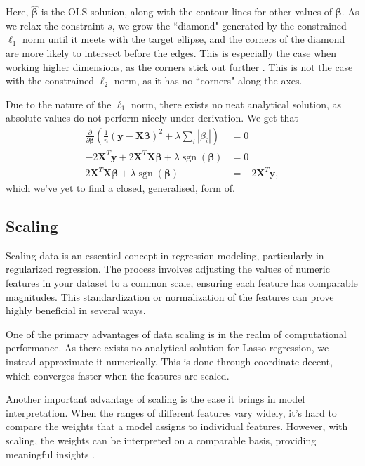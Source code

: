 \documentclass{article}
\DeclareMathOperator*{\sgn}{sgn}
\begin{document}
Here, $\boldsymbol{\hat{\beta}}$ is the OLS solution, along with the contour lines for other values of $\boldsymbol{\beta}$. As we relax the constraint $s$, we grow the ``diamond" generated by the constrained $\ell_1$ norm until it meets with the target ellipse, and the corners of the diamond are more likely to intersect before the edges. This is especially the case when working higher dimensions, as the corners stick out further \cite[p.~432--436]{Murphy2012}. This is not the case with the constrained $\ell_2$ norm, as it has no ``corners" along the axes.

Due to the nature of the $\ell_1$ norm, there exists no neat analytical solution, as absolute values do not perform nicely under derivation. We get that
\begin{align*}
    \frac{\partial}{\partial \boldsymbol{\beta}} \left( \frac{1}{n} \left( \boldsymbol{y} - \textbf{X} \boldsymbol{\beta} \right)^2 + \lambda \sum_i |\beta_i| \right) &= 0 \\
    -2 \textbf{X}^T \boldsymbol{y} + 2 \textbf{X}^T \textbf{X} \boldsymbol{\beta} + \lambda \sgn(\boldsymbol{\beta}) &= 0 \\
    2 \textbf{X}^T \textbf{X} \boldsymbol{\beta} + \lambda \sgn(\boldsymbol{\beta}) &= -2 \textbf{X}^T \boldsymbol{y},
\end{align*}
which we've yet to find a closed, generalised, form of.

\subsection{Scaling}
Scaling data is an essential concept in regression modeling, particularly in regularized regression. The process involves adjusting the values of numeric features in your dataset to a common scale, ensuring each feature has comparable magnitudes.
This standardization or normalization of the features can prove highly beneficial in several ways.

One of the primary advantages of data scaling is in the realm of computational performance. As there exists no analytical solution for Lasso regression, we instead approximate it numerically. This is done through coordinate decent, which converges faster when the features are scaled.

Another important advantage of scaling is the ease it brings in model interpretation. When the ranges of different features vary widely, it's hard to compare the weights that a model assigns to individual features. However, with scaling, the weights can be interpreted on a comparable basis, providing meaningful insights \cite[p.~237]{james2021introduction}.
\end{document}
